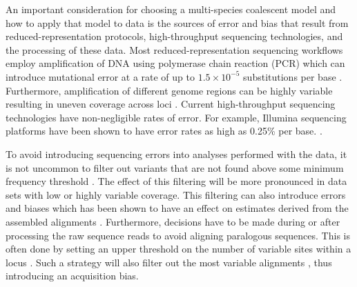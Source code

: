 An important consideration for choosing a multi-species coalescent model and how
to apply that model to data is
the sources of error and bias that result from reduced-representation protocols,
high-throughput sequencing technologies, and the processing of these data.
Most reduced-representation sequencing workflows employ amplification of DNA  
using polymerase chain reaction (PCR) which can introduce mutational error at a 
rate of up to $1.5\times10^{-5}$ substitutions per base \citep{potapovExaminingSourcesError2017}.
Furthermore, amplification of different genome regions can be highly variable 
resulting in uneven coverage across loci \citep{airdAnalyzingMinimizingPCR2011}. 
Current high-throughput sequencing technologies have non-negligible rates of error.
For example, Illumina sequencing platforms have been shown to have error rates
as high as 0.25\% per base. \citep{pfeifferSystematicEvaluationError2018}. 



To avoid introducing sequencing errors into analyses performed with the data, it is not 
uncommon to filter out variants that are not found above some minimum frequency 
threshold \citep{rochetteStacksAnalyticalMethods2019, linckMinorAlleleFrequency2019}. 
The effect of this filtering will be more pronounced in data sets with low or 
highly variable coverage.
This filtering can also introduce errors and biases which has been 
shown to have an effect on estimates derived from the assembled alignments
\citep{Harvey2015,linckMinorAlleleFrequency2019}.
Furthermore, decisions have to be made during or after processing
the raw sequence reads to avoid aligning paralogous sequences.
This is often done by setting an upper threshold on the number of variable
sites within a locus \citep{harveySimilarityThresholdsUsed2015}. 
Such a strategy will also filter out the most variable alignments
, thus introducing an acquisition bias.


